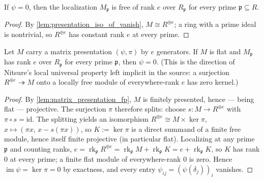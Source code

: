 \begin{lemma}
  \label{lem:presentation_rank_of_vanish}
  \leanok
  If \(\psi = 0\), then the localization \(M_{\mathfrak p}\) is free of rank
  \(e\) over \(R_{\mathfrak p}\) for every prime
  \(\mathfrak p \subseteq R\).
\end{lemma}

\begin{proof}
  \leanok
  By \cref{lem:presentation_iso_of_vanish}, \(M \cong R^{\oplus e}\); a ring
  with a prime ideal is nontrivial, so \(R^{\oplus e}\) has constant rank
  \(e\) at every prime.
\end{proof}

\begin{theorem}
  \label{thm:entry_ideal_flat_vanish}
  \leanok
  Let \(M\) carry a matrix presentation \((\psi, \pi)\) by \(e\) generators.
  If \(M\) is flat and \(M_{\mathfrak p}\) has rank \(e\) over
  \(R_{\mathfrak p}\) for every prime \(\mathfrak p\), then \(\psi = 0\).
  (This is the direction of Nitsure's local universal property left implicit
  in the source: a surjection \(R^{\oplus e} \twoheadrightarrow M\) onto a
  locally free module of everywhere-rank \(e\) has zero kernel.)
\end{theorem}

\begin{proof}
  \leanok
  By \cref{lem:matrix_presentation_fp}, \(M\) is finitely presented, hence
  --- being flat --- projective.  The surjection \(\pi\) therefore splits:
  choose \(s : M \to R^{\oplus e}\) with \(\pi \circ s = \mathrm{id}\).
  The splitting yields an isomorphism
  \(R^{\oplus e} \cong M \times \ker \pi\), \(x \mapsto
  (\pi x,\, x - s(\pi x))\), so \(K := \ker \pi\) is a direct summand of a
  finite free module, hence itself finite projective (in particular flat).
  Localizing at any prime \(\mathfrak p\) and counting ranks,
  \(e = \operatorname{rk}_{\mathfrak p} R^{\oplus e}
     = \operatorname{rk}_{\mathfrak p} M + \operatorname{rk}_{\mathfrak p} K
     = e + \operatorname{rk}_{\mathfrak p} K\),
  so \(K\) has rank \(0\) at every prime; a finite flat module of
  everywhere-rank \(0\) is zero.  Hence
  \(\operatorname{im} \psi = \ker \pi = 0\) by exactness, and every entry
  \(\psi_{ij} = (\psi(\delta_j))_i\) vanishes.
\end{proof}


